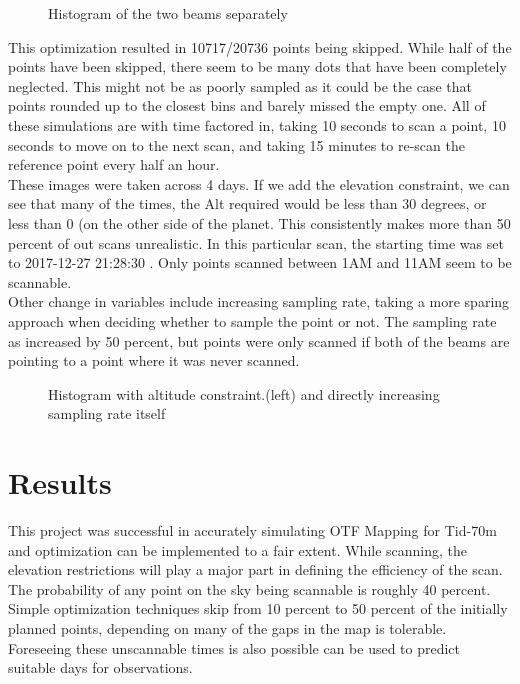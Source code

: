 \documentclass{article}%
\begin{document}
\begin{figure}[h!]
    \centering
    \qquad
    \caption{Histogram of the two beams separately}
\end{figure}
This optimization resulted in 10717/20736 points being skipped. While half of the points have been skipped, there seem to be
many dots that have been completely neglected. This might not be as poorly sampled as it could be the case that points rounded up to the
closest bins and barely missed the empty one. 
\newpage
All of these simulations are with time factored in, taking 10 seconds to scan a point, 10 seconds to move on to the next scan, 
and taking 15 minutes to re-scan
the reference point every half an hour.\\
These images were taken across 4 days. If we add the elevation constraint, we can see that many of the times, the Alt required would be less than 30 degrees, or less than 0 (on the other side of the planet. This consistently makes more than 50 percent of out scans unrealistic. In this particular scan, the starting time was set to 2017-12-27 21:28:30 . Only points scanned between 1AM and 11AM seem to be scannable.\\

Other change in variables include increasing sampling rate, taking a more sparing approach when deciding whether to sample the point or not. The sampling rate as increased 
by 50 percent, but points were only scanned if both of the beams are pointing to a point where it was never scanned.

\begin{figure}[h!]
    \centering
    \qquad
    \caption{Histogram with altitude constraint.(left) and directly increasing sampling rate itself}
\end{figure}


\newpage
\section{Results}
This project was successful in accurately simulating OTF Mapping for Tid-70m and optimization can be implemented to a fair extent. While scanning, the elevation restrictions will
play a major part in defining the efficiency of the scan. The probability of any point on the sky being scannable is roughly 40 percent. Simple optimization techniques skip from 10 percent to 50 percent of the initially planned points, depending on many of the gaps in the map is tolerable. Foreseeing these unscannable times is also possible can be used to predict suitable days for observations.
\end{document}
